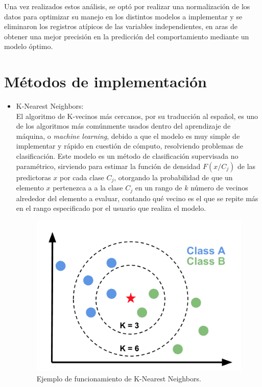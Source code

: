 \documentclass[runningheads]{llncs}
\begin{document}
\textsc Una vez realizados estos análisis, se optó por realizar una normalización de los datos para optimizar su manejo en los distintos modelos a implementar y se eliminaron los registros atípicos de las variables independientes, en aras de obtener una mejor precisión en la predicción del comportamiento mediante un modelo óptimo.

\newpage

\section{Métodos de implementación}
\begin{itemize}
    \item K-Nearest Neighbors:\\
    El algoritmo de K-vecinos más cercanos, por su traducción al español, es uno de los algoritmos más comúnmente usados dentro del aprendizaje de máquina, o \textit{machine learning}, debido a que el modelo es muy simple de implementar y rápido en cuestión de cómputo, resolviendo problemas de clasificación. Este modelo es un método de clasificación supervisada no paramétrico, sirviendo para estimar la función de densidad $F(x/C_j)$ de las predictoras $x$ por cada clase $C_j$, otorgando la probabilidad de que un elemento $x$ pertenezca a a la clase $C_j$ en un rango de $k$ número de vecinos alrededor del elemento a evaluar, contando qué vecino es el que se repite más en el rango especificado por el usuario que realiza el modelo.
    
    \begin{figure}
        \centering
        \includegraphics[width=1\columnwidth]{kNN_Neighbors.png}
        \caption{Ejemplo de funcionamiento de K-Nearest Neighbors.}
        \label{fig:comand}%
    \end{figure} \newpage
    

\end{itemize}
\end{document}
